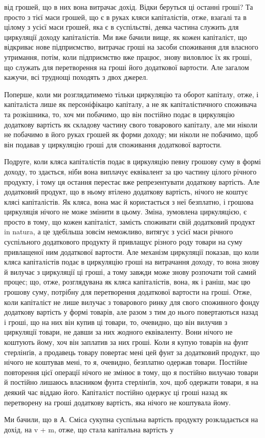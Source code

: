 від грошей, що в них вона витрачає дохід. Відки беруться ці останні
гроші? Та просто з тієї маси грошей, що є в руках кляси капіталістів,
отже, взагалі та в цілому з усієї маси грошей, яка є в суспільстві,
деяка частина служить для циркуляції доходу капіталістів. Ми
вже бачили вище, як кожен капіталіст, що відкриває нове підприємство,
витрачає гроші на засоби споживання для власного утримання, потім,
коли підприємство вже працює, знову виловлює їх як гроші, що служать
для перетворення на гроші його додаткової вартости. Але загалом кажучи,
всі труднощі походять з двох джерел.

Поперше, коли ми розглядатимемо тільки циркуляцію та оборот капіталу,
отже, і капіталіста лише як персоніфікацю капіталу, а не як капіталістичного
споживача та розкішника, то, хоч ми побачимо, що він
постійно подає в циркуляцію додаткову вартість як складову частину
свого товарового капіталу, але ми ніколи не побачимо в його руках грошей
як форми доходу; ми ніколи не побачимо, щоб він подавав у циркуляцію
гроші для споживання додаткової вартости.

Подруге, коли кляса капіталістів подає в циркуляцію певну грошову
суму в формі доходу, то здається, ніби вона виплачує еквівалент за цю
частину цілого річного продукту, і тому ця остання перестає вже репрезентувати
додаткову вартість. Але додатковий продукт, що в ньому
втілено додаткову вартість, нічого не коштує клясі капіталістів. Як кляса,
вона має й користається з неї безплатно, і грошова циркуляція нічого
не може змінити в цьому. Зміна, зумовлена циркуляцією, є просто в тому,
що кожен капіталіст, замість споживати свій додатковий продукт in natura,
а це здебільша зовсім неможливо, витягує з усієї маси річного суспільного
додаткового продукту й привлащує різного роду товари на суму
привлащеної ним додаткової вартости. Але механізм циркуляції показав,
що коли кляса капіталістів подає в циркуляцію гроші на витрачання
доходу, то вона знову й вилучає з циркуляції ці гроші, а тому завжди
може знову розпочати той самий процес; що, отже, розглядувана як
кляса капіталістів, вона, як і раніш, має цю грошову суму, потрібну для
перетворення додаткової вартости на гроші. Отже, коли капіталіст не
лише вилучає з товарового ринку для свого споживного фонду додаткову
вартість у формі товарів, але разом з тим до нього повертаються назад
і гроші, що на них він купив ці товари, то, очевидно, що він вилучив
з циркуляції товари, не давши за них жодного еквіваленту. Вони нічого
не коштують йому, хоч він заплатив за них гроші. Коли я купую товарів
на фунт стерлінґів, а продавець товару повертає мені цей фунт за додатковий
продукт, що нічого не коштував мені, то я, очевидно, безплатно
одержав товари. Постійне повторення цієї операції нічого не змінює в
тому, що я постійно вилучаю товари й постійно лишаюсь власником
фунта стерлінґів, хоч, щоб одержати товари, я на деякий час віддаю
його. Капіталіст постійно одержує ці гроші назад як перетворену на
гроші додаткову вартість, яка нічого не коштувала йому.

Ми бачили, що в А. Сміса сукупна суспільна вартість продукту розкладається
на дохід, на v + m, отже, що стала капітальна вартість у
